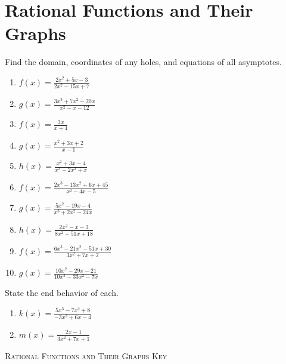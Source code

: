 \chapter{Rational Functions and Their Graphs}

Find the domain, coordinates of any holes, and equations of all asymptotes.
\begin{enumerate}
\setlength\itemsep{10pt}
	\item $f(x) = \frac{2x^2+5x-3}{2x^2-15x+7}$
	\item $g(x) = \frac{3x^3+7x^2-20x}{x^2-x-12}$
	\item $f(x) = \frac{3x}{x+4}$
	\item $g(x) = \frac{x^2+3x+2}{x-1}$
	\item $h(x) = \frac{x^2+3x-4}{x^3-2x^2+x}$
	\item $f(x) = \frac{2x^3-13x^2+6x+45}{x^2-4x-5}$
	\item $g(x) = \frac{5x^2-19x-4}{x^3+2x^2-24x}$
	\item $h(x) = \frac{2x^2-x-3}{8x^2+51x+18}$
	\item $f(x) = \frac{6x^3 - 21x^2 - 51x + 30}{3x^2+7x+2}$
	\item $g(x) = \frac{10x^2-29x-21}{10x^3-33x^2-7x}$
\end{enumerate}	\setcounter{Review}{\value{enumi}}

State the end behavior of each.
\begin{enumerate}	\setcounter{enumi}{\value{Review}}
	\item $k(x) = \frac{5x^3-7x^2+8}{-3x^3+6x-4}$
	\item $m(x) = \frac{2x-1}{3x^2+7x+1}$
\end{enumerate}

\newpage

\textsc{Rational Functions and Their Graphs Key}

